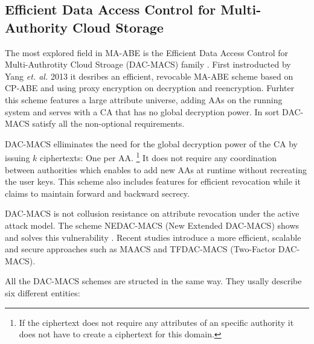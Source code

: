 \subsection{Efficient Data Access Control for Multi-Authority Cloud Storage}
The most explored field in MA-ABE is the Efficient Data Access Control for Multi-Authrotity Cloud Stroage (DAC-MACS) family \cite{yang2013dac}. First instroducted by Yang \textit{et. al.} 2013 it desribes an efficient, revocable MA-ABE scheme based on CP-ABE and using proxy encryption on decryption and reencryption. Furhter this scheme features a large attribute universe, adding AAs on the running system and serves with a CA that has no global decryption power. In sort DAC-MACS satisfy all the non-optional requirements.

DAC-MACS elliminates the need for the global decryption power of the CA by issuing $k$ ciphertexts: One per AA. \footnote{If the ciphertext does not require any attributes of an specific authority it does not have to create a ciphertext for this domain.} It does not require any coordination between authorities which enables to add new AAs at runtime without recreating the user keys. This scheme also includes features for efficient revocation while it claims to maintain forward and backward secrecy.

DAC-MACS is not collusion resistance on attribute revocation under the active attack model. The scheme NEDAC-MACS (New Extended DAC-MACS) shows and solves this vulnerability \cite{wu2017security}. Recent studies introduce a more efficient, scalable and secure approaches such as MAACS \cite{li2016secure} and TFDAC-MACS (Two-Factor DAC-MACS)\cite{li2017two}. 

All the DAC-MACS schemes are structed in the same way. They usally describe six different entities:

